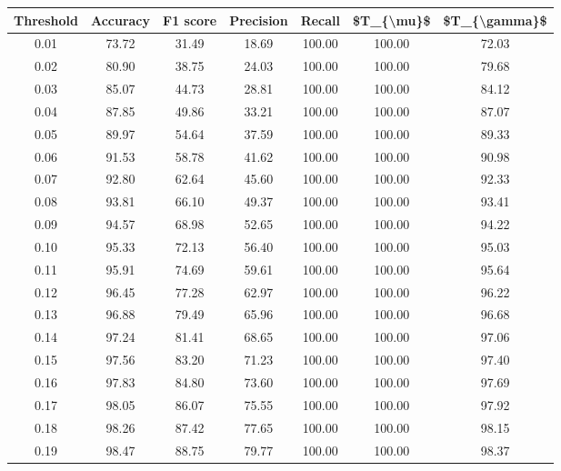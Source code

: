 \begin{tabular}{|c|c|c|c|c|c|c|}
\hline
 Threshold &  Accuracy &  F1 score &  Precision &  Recall &  \$T\_\{\textbackslash mu\}\$ &  \$T\_\{\textbackslash gamma\}\$ \\
\hline
      0.01 &     73.72 &     31.49 &      18.69 &  100.00 &     100.00 &         72.03 \\
      0.02 &     80.90 &     38.75 &      24.03 &  100.00 &     100.00 &         79.68 \\
      0.03 &     85.07 &     44.73 &      28.81 &  100.00 &     100.00 &         84.12 \\
      0.04 &     87.85 &     49.86 &      33.21 &  100.00 &     100.00 &         87.07 \\
      0.05 &     89.97 &     54.64 &      37.59 &  100.00 &     100.00 &         89.33 \\
      0.06 &     91.53 &     58.78 &      41.62 &  100.00 &     100.00 &         90.98 \\
      0.07 &     92.80 &     62.64 &      45.60 &  100.00 &     100.00 &         92.33 \\
      0.08 &     93.81 &     66.10 &      49.37 &  100.00 &     100.00 &         93.41 \\
      0.09 &     94.57 &     68.98 &      52.65 &  100.00 &     100.00 &         94.22 \\
      0.10 &     95.33 &     72.13 &      56.40 &  100.00 &     100.00 &         95.03 \\
      0.11 &     95.91 &     74.69 &      59.61 &  100.00 &     100.00 &         95.64 \\
      0.12 &     96.45 &     77.28 &      62.97 &  100.00 &     100.00 &         96.22 \\
      0.13 &     96.88 &     79.49 &      65.96 &  100.00 &     100.00 &         96.68 \\
      0.14 &     97.24 &     81.41 &      68.65 &  100.00 &     100.00 &         97.06 \\
      0.15 &     97.56 &     83.20 &      71.23 &  100.00 &     100.00 &         97.40 \\
      0.16 &     97.83 &     84.80 &      73.60 &  100.00 &     100.00 &         97.69 \\
      0.17 &     98.05 &     86.07 &      75.55 &  100.00 &     100.00 &         97.92 \\
      0.18 &     98.26 &     87.42 &      77.65 &  100.00 &     100.00 &         98.15 \\
      0.19 &     98.47 &     88.75 &      79.77 &  100.00 &     100.00 &         98.37 \\

\end{tabular}
